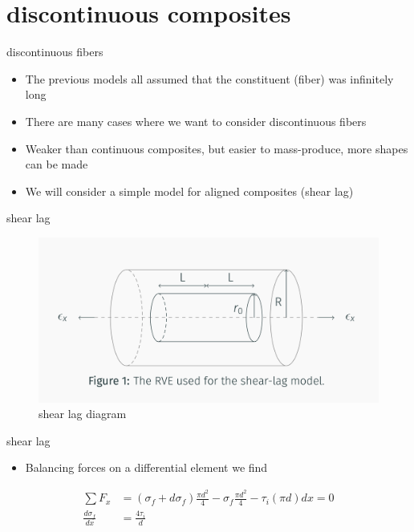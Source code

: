 \documentclass[
  letterpaper,
  ignorenonframetext,
  aspectratio=43,
  handout,
  12pt]{beamer}
\providecommand{\tightlist}{%
  \setlength{\itemsep}{0pt}\setlength{\parskip}{0pt}}
\providecommand{\tightlist}{%
\setlength{\itemsep}{0pt}\setlength{\parskip}{0pt}}
\let\Oldincludegraphics\includegraphics
\renewcommand{\includegraphics}[2][]{\Oldincludegraphics[width=\textwidth,height=0.7\textheight,keepaspectratio]{#2}}
\begin{document}
\hypertarget{discontinuous-composites}{%
\section{discontinuous composites}\label{discontinuous-composites}}

\begin{frame}{discontinuous fibers}
\protect\hypertarget{discontinuous-fibers}{}
\begin{itemize}
\tightlist
\item
  The previous models all assumed that the constituent (fiber) was
  infinitely long
\item
  There are many cases where we want to consider discontinuous fibers
\item
  Weaker than continuous composites, but easier to mass-produce, more
  shapes can be made
\item
  We will consider a simple model for aligned composites (shear lag)
\end{itemize}
\end{frame}

\begin{frame}{shear lag}
\protect\hypertarget{shear-lag}{}
\begin{figure}
\centering
\includegraphics{../images/shearlag-intro.PNG}
\caption{shear lag diagram}
\end{figure}
\end{frame}

\begin{frame}{shear lag}
\protect\hypertarget{shear-lag-1}{}
\begin{itemize}
\tightlist
\item
  Balancing forces on a differential element we find
\end{itemize}

\[\begin{aligned}
  \sum F_x &= (\sigma_f + d\sigma_f) \frac{\pi d^2}{4} - \sigma_f\frac{\pi d^2}{4} - \tau_i (\pi d) dx = 0\\
  \frac{d\sigma_f}{dx} &= \frac{4\tau_i}{d}
\end{aligned}\]
\end{frame}
\end{document}
